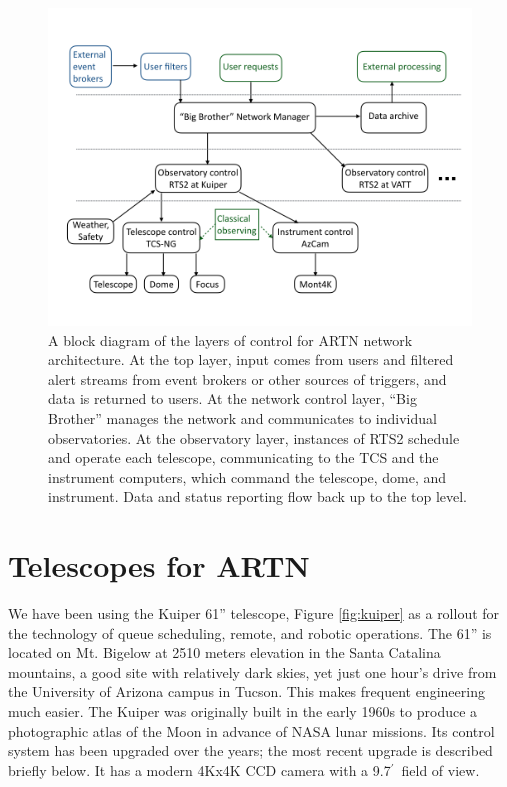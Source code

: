 \documentclass[]{spie}  %
\def\arcmin{$^{\prime}$}
\begin{document}
 \begin{figure} [ht]
   \begin{center}
   \includegraphics[width=15cm]{layer_block_diagram.png}
  \end{center}
   \caption[] 
   { \label{fig:layers} 
A block diagram of the layers of control for ARTN network architecture. At the top layer, input comes from users and filtered alert streams from event brokers or other sources of triggers, and data is returned to users. At the network control layer, ``Big Brother'' manages the network and communicates to individual observatories. At the observatory layer, instances of RTS2 schedule and operate each telescope, communicating to the TCS and the instrument computers, which command the telescope, dome, and instrument.  Data and status reporting flow back up to the top level.
}
  \end{figure} 


\section{Telescopes for ARTN}

We have been using the Kuiper 61'' telescope, Figure \ref{fig:kuiper} as a rollout for the technology of queue scheduling, remote, and robotic operations.  The 61'' is located 
on Mt. Bigelow at 2510 meters elevation in the Santa Catalina mountains, a good site with relatively dark skies, yet just one hour's drive from the University of Arizona campus in Tucson. This makes frequent engineering much easier.  The Kuiper was originally built in the early 1960s to produce a photographic atlas of the Moon in advance of NASA lunar missions. Its control system has been upgraded over the years; the most recent upgrade is described briefly below. It has a modern 4Kx4K CCD camera with a 9.7\arcmin\ field of view. 
\end{document}
